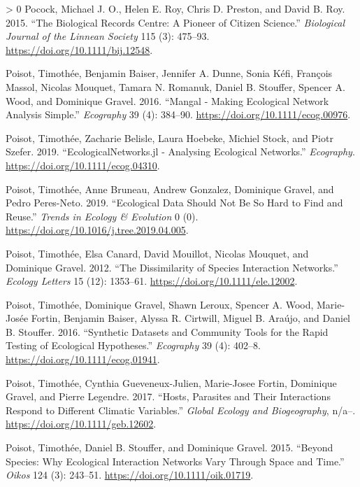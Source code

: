 \documentclass[10pt,oneside]{article}
\newlength{\cslhangindent}
\newenvironment{CSLReferences}[3] %
 {%
  \setlength{\parindent}{0pt}
  \ifodd #1 \everypar{\setlength{\hangindent}{\cslhangindent}}\ignorespaces\fi
  \ifnum #2 > 0
  \setlength{\parskip}{#2\baselineskip}
  \fi
 }%
 {}
\begin{document}
\begin{CSLReferences}{1}{0}
\leavevmode\hypertarget{ref-Pocock2015BioRec}{}%
Pocock, Michael J. O., Helen E. Roy, Chris D. Preston, and David B. Roy.
2015. {``The Biological Records Centre: A Pioneer of Citizen Science.''}
\emph{Biological Journal of the Linnean Society} 115 (3): 475--93.
\url{https://doi.org/10.1111/bij.12548}.

\leavevmode\hypertarget{ref-Poisot2016ManMak}{}%
Poisot, Timothée, Benjamin Baiser, Jennifer A. Dunne, Sonia Kéfi,
François Massol, Nicolas Mouquet, Tamara N. Romanuk, Daniel B. Stouffer,
Spencer A. Wood, and Dominique Gravel. 2016. {``Mangal - Making
Ecological Network Analysis Simple.''} \emph{Ecography} 39 (4): 384--90.
\url{https://doi.org/10.1111/ecog.00976}.

\leavevmode\hypertarget{ref-Poisot2019EcoJl}{}%
Poisot, Timothée, Zacharie Belisle, Laura Hoebeke, Michiel Stock, and
Piotr Szefer. 2019. {``EcologicalNetworks.jl - Analysing Ecological
Networks.''} \emph{Ecography}. \url{https://doi.org/10.1111/ecog.04310}.

\leavevmode\hypertarget{ref-Poisot2019EcoDat}{}%
Poisot, Timothée, Anne Bruneau, Andrew Gonzalez, Dominique Gravel, and
Pedro Peres-Neto. 2019. {``Ecological Data Should Not Be So Hard to Find
and Reuse.''} \emph{Trends in Ecology \& Evolution} 0 (0).
\url{https://doi.org/10.1016/j.tree.2019.04.005}.

\leavevmode\hypertarget{ref-Poisot2012DisSpe}{}%
Poisot, Timothée, Elsa Canard, David Mouillot, Nicolas Mouquet, and
Dominique Gravel. 2012. {``The Dissimilarity of Species Interaction
Networks.''} \emph{Ecology Letters} 15 (12): 1353--61.
\url{https://doi.org/10.1111/ele.12002}.

\leavevmode\hypertarget{ref-Poisot2016SynDat}{}%
Poisot, Timothée, Dominique Gravel, Shawn Leroux, Spencer A. Wood,
Marie-Josée Fortin, Benjamin Baiser, Alyssa R. Cirtwill, Miguel B.
Araújo, and Daniel B. Stouffer. 2016. {``Synthetic Datasets and
Community Tools for the Rapid Testing of Ecological Hypotheses.''}
\emph{Ecography} 39 (4): 402--8.
\url{https://doi.org/10.1111/ecog.01941}.

\leavevmode\hypertarget{ref-Poisot2017HosPar}{}%
Poisot, Timothée, Cynthia Gueveneux-Julien, Marie-Josee Fortin,
Dominique Gravel, and Pierre Legendre. 2017. {``Hosts, Parasites and
Their Interactions Respond to Different Climatic Variables.''}
\emph{Global Ecology and Biogeography}, n/a--.
\url{https://doi.org/10.1111/geb.12602}.

\leavevmode\hypertarget{ref-Poisot2015SpeWhy}{}%
Poisot, Timothée, Daniel B. Stouffer, and Dominique Gravel. 2015.
{``Beyond Species: Why Ecological Interaction Networks Vary Through
Space and Time.''} \emph{Oikos} 124 (3): 243--51.
\url{https://doi.org/10.1111/oik.01719}.


\end{CSLReferences}
\end{document}
